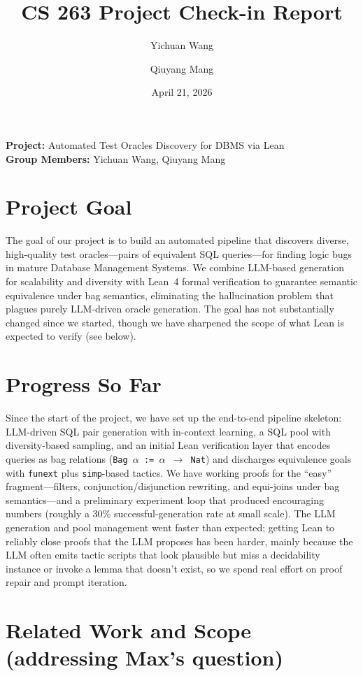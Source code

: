 \documentclass[11pt]{article}
\title{\textbf{CS 263 Project Check-in Report}}
\author{Yichuan Wang \and Qiuyang Mang}
\date{April 21, 2026}
\newcommand{\code}[1]{\texttt{#1}}
\begin{document}
\maketitle

\noindent\textbf{Project:} Automated Test Oracles Discovery for DBMS via Lean\\
\textbf{Group Members:} Yichuan Wang, Qiuyang Mang

\section*{Project Goal}

The goal of our project is to build an automated pipeline that discovers diverse, high-quality test oracles---pairs of equivalent SQL queries---for finding logic bugs in mature Database Management Systems. We combine LLM-based generation for scalability and diversity with Lean~4 formal verification to guarantee semantic equivalence under bag semantics, eliminating the hallucination problem that plagues purely LLM-driven oracle generation. The goal has not substantially changed since we started, though we have sharpened the scope of what Lean is expected to verify (see below).

\section*{Progress So Far}

Since the start of the project, we have set up the end-to-end pipeline skeleton: LLM-driven SQL pair generation with in-context learning, a SQL pool with diversity-based sampling, and an initial Lean verification layer that encodes queries as bag relations (\code{Bag $\alpha$ := $\alpha$ $\to$ Nat}) and discharges equivalence goals with \code{funext} plus \code{simp}-based tactics. We have working proofs for the ``easy'' fragment---filters, conjunction/disjunction rewriting, and equi-joins under bag semantics---and a preliminary experiment loop that produced encouraging numbers (roughly a 30\% successful-generation rate at small scale). The LLM generation and pool management went faster than expected; getting Lean to reliably close proofs that the LLM proposes has been harder, mainly because the LLM often emits tactic scripts that look plausible but miss a decidability instance or invoke a lemma that doesn't exist, so we spend real effort on proof repair and prompt iteration.

\section*{Related Work and Scope (addressing Max's question)}
\end{document}
